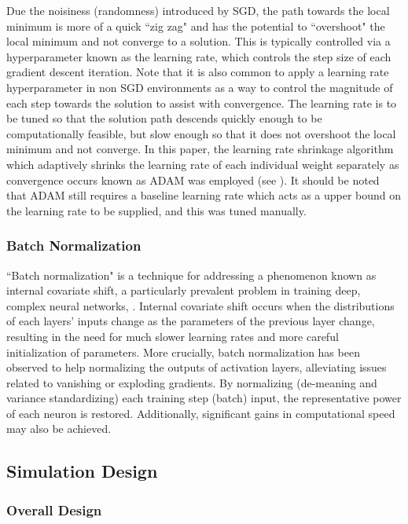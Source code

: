 \documentclass[a4paper, table]{article}
\newcommand{\smalltodo}[2][] {\todo[caption={#2}, size=\scriptsize,%
	fancyline,#1]{\begin{spacing}{.5}#2\end{spacing}}}
\newcommand{\rhs}[2][]{\smalltodo[color=green!30,#1]{{\bf RS:} #2}}
\begin{document}
\rhs{Define learning rate more properly}

Due the noisiness (randomness) introduced by SGD, the path towards the local minimum is more of a quick ``zig zag" and has the potential to ``overshoot" the local minimum and not converge to a solution. This is typically controlled via a hyperparameter known as the learning rate, which controls the step size of each gradient descent iteration. Note that it is also common to apply a learning rate hyperparameter in non SGD environments as a way to control the magnitude of each step towards the solution to assist with convergence. The learning rate is to be tuned so that the solution path descends quickly enough to be computationally feasible, but slow enough so that it does not overshoot the local minimum and not converge. In this paper, the learning rate shrinkage algorithm which adaptively shrinks the learning rate of each individual weight separately as convergence occurs known as ADAM was employed (see \cite{kingma_adam:_2014}). It should be noted that ADAM still requires a baseline learning rate which acts as a upper bound on the learning rate to be supplied, and this was tuned manually.

\subsubsection{Batch Normalization}

``Batch normalization" is a technique for addressing a phenomenon known as internal covariate shift, a particularly prevalent problem in training deep, complex neural networks, \citep{ioffe_batch_2015}. Internal covariate shift occurs when the distributions of each layers' inputs change as the parameters of the previous layer change, resulting in the need for much slower learning rates and more careful initialization of parameters. More crucially, batch normalization has been observed to help normalizing the outputs of activation layers, alleviating issues related to vanishing or exploding gradients. By normalizing (de-meaning and variance standardizing) each training step (batch) input, the representative power of each neuron is restored. Additionally, significant gains in computational speed may also be achieved.

\subsection{Simulation Design}

\subsubsection{Overall Design}
\end{document}
